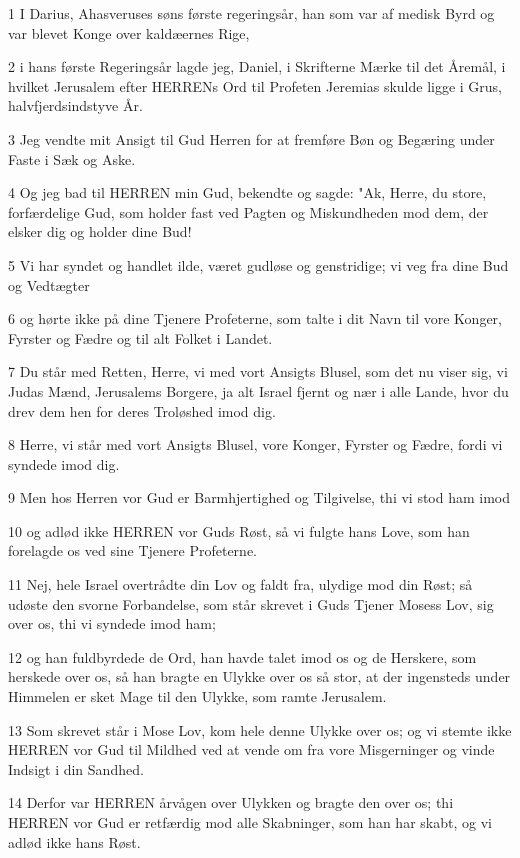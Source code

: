 \par 1 I Darius, Ahasveruses søns første regeringsår, han som var af medisk Byrd og var blevet Konge over kaldæernes Rige,
\par 2 i hans første Regeringsår lagde jeg, Daniel, i Skrifterne Mærke til det Åremål, i hvilket Jerusalem efter HERRENs Ord til Profeten Jeremias skulde ligge i Grus, halvfjerdsindstyve År.
\par 3 Jeg vendte mit Ansigt til Gud Herren for at fremføre Bøn og Begæring under Faste i Sæk og Aske.
\par 4 Og jeg bad til HERREN min Gud, bekendte og sagde: "Ak, Herre, du store, forfærdelige Gud, som holder fast ved Pagten og Miskundheden mod dem, der elsker dig og holder dine Bud!
\par 5 Vi har syndet og handlet ilde, været gudløse og genstridige; vi veg fra dine Bud og Vedtægter
\par 6 og hørte ikke på dine Tjenere Profeterne, som talte i dit Navn til vore Konger, Fyrster og Fædre og til alt Folket i Landet.
\par 7 Du står med Retten, Herre, vi med vort Ansigts Blusel, som det nu viser sig, vi Judas Mænd, Jerusalems Borgere, ja alt Israel fjernt og nær i alle Lande, hvor du drev dem hen for deres Troløshed imod dig.
\par 8 Herre, vi står med vort Ansigts Blusel, vore Konger, Fyrster og Fædre, fordi vi syndede imod dig.
\par 9 Men hos Herren vor Gud er Barmhjertighed og Tilgivelse, thi vi stod ham imod
\par 10 og adlød ikke HERREN vor Guds Røst, så vi fulgte hans Love, som han forelagde os ved sine Tjenere Profeterne.
\par 11 Nej, hele Israel overtrådte din Lov og faldt fra, ulydige mod din Røst; så udøste den svorne Forbandelse, som står skrevet i Guds Tjener Mosess Lov, sig over os, thi vi syndede imod ham;
\par 12 og han fuldbyrdede de Ord, han havde talet imod os og de Herskere, som herskede over os, så han bragte en Ulykke over os så stor, at der ingensteds under Himmelen er sket Mage til den Ulykke, som ramte Jerusalem.
\par 13 Som skrevet står i Mose Lov, kom hele denne Ulykke over os; og vi stemte ikke HERREN vor Gud til Mildhed ved at vende om fra vore Misgerninger og vinde Indsigt i din Sandhed.
\par 14 Derfor var HERREN årvågen over Ulykken og bragte den over os; thi HERREN vor Gud er retfærdig mod alle Skabninger, som han har skabt, og vi adlød ikke hans Røst.
